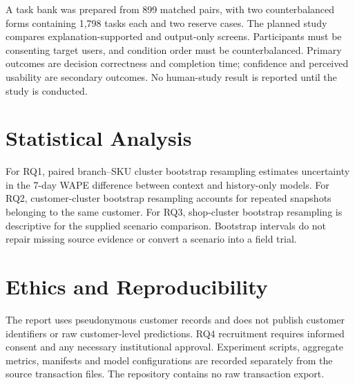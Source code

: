 A task bank was prepared from 899 matched pairs, with two counterbalanced forms containing 1,798 tasks each and two reserve cases. The planned study compares explanation-supported and output-only screens. Participants must be consenting target users, and condition order must be counterbalanced. Primary outcomes are decision correctness and completion time; confidence and perceived usability are secondary outcomes. No human-study result is reported until the study is conducted.

\section{Statistical Analysis}
For RQ1, paired branch--SKU cluster bootstrap resampling estimates uncertainty in the 7-day WAPE difference between context and history-only models. For RQ2, customer-cluster bootstrap resampling accounts for repeated snapshots belonging to the same customer. For RQ3, shop-cluster bootstrap resampling is descriptive for the supplied scenario comparison. Bootstrap intervals do not repair missing source evidence or convert a scenario into a field trial.

\section{Ethics and Reproducibility}
The report uses pseudonymous customer records and does not publish customer identifiers or raw customer-level predictions. RQ4 recruitment requires informed consent and any necessary institutional approval. Experiment scripts, aggregate metrics, manifests and model configurations are recorded separately from the source transaction files. The repository contains no raw transaction export.
